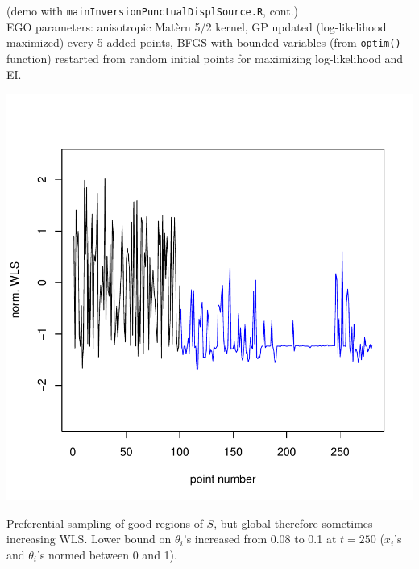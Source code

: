 \begin{frame}{}
\small (demo with \texttt{mainInversionPunctualDisplSource.R}, cont.)\\
\small EGO parameters: anisotropic Mat\`ern 5/2 kernel, GP updated (log-likelihood maximized) every 5 added points, BFGS with bounded variables (from \texttt{optim()} function) restarted from random initial points for maximizing log-likelihood and EI.
\begin{minipage}[c]{0.6\textwidth}
\begin{center}
\includegraphics[width=\textwidth]{4_optimization/figures/misfit_EGO_conv} 
\end{center}
\end{minipage}
\hspace{0.3cm}
\begin{minipage}[c]{0.3\textwidth}
Preferential sampling of good regions of $S$, but global therefore sometimes increasing WLS.
Lower bound on $\theta_i$'s increased from 0.08 to 0.1 at $t=250$ ($x_i$'s and $\theta_i$'s
normed between 0 and 1).
\end{minipage}
\end{frame}

